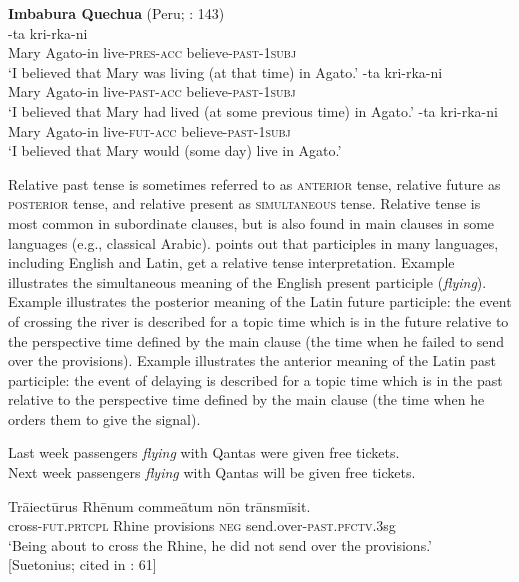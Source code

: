 \ea \label{ex:21.18}
\textbf{Imbabura Quechua} (Peru; \citealt{Cole1982}: 143)\\
-ta  kri-rka-ni\\
Mary  Agato-in  live-\textsc{pres}-\textsc{acc}  believe-\textsc{past}-\textsc{1subj}\\
‘I believed that Mary was living (at that time) in Agato.’
-ta  kri-rka-ni\\
Mary  Agato-in  live-\textsc{past}-\textsc{acc}  believe-\textsc{past}-\textsc{1subj}\\
‘I believed that Mary had lived (at some previous time) in Agato.’
-ta  kri-rka-ni\\
Mary  Agato-in  live-\textsc{fut}-\textsc{acc}  believe-\textsc{past}-\textsc{1subj}\\
‘I believed that Mary would (some day) live in Agato.’
\z \z


Relative past tense is sometimes referred to as \textsc{anterior} tense, relative future as \textsc{posterior} tense, and relative present as \textsc{simultaneous} tense. Relative tense is most common in subordinate clauses, but is also found in main clauses in some languages (e.g., classical Arabic). \citet{Comrie1985} points out that participles in many languages, including English and Latin, get a relative tense interpretation. Example  illustrates the simultaneous meaning of the English present participle (\textit{flying}). Example  illustrates the posterior meaning of the Latin future participle: the event of crossing the river is described for a topic time which is in the future relative to the perspective time defined by the main clause (the time when he failed to send over the provisions). Example  illustrates the anterior meaning of the Latin past participle: the event of delaying is described for a topic time which is in the past relative to the perspective time defined by the main clause (the time when he orders them to give the signal).


\ea \label{ex:21.19}
\ea  Last week passengers \textit{flying} with Qantas were given free tickets.\\
\ex Next week passengers \textit{flying} with Qantas will be given free tickets.
                       \z
\z

\ea \label{ex:21.20}
\gll Trāiectūrus  Rhēnum  commeātum  nōn  trānsmīsit.\\
cross-\textsc{fut.prtcpl}  Rhine  provisions  \textsc{neg}  send.over-\textsc{past.pfctv.3}sg\\
\glt ‘Being about to cross the Rhine, he did not send over the provisions.’\\
{}[Suetonius; cited in \citealt{Comrie1985}: 61]
\z

